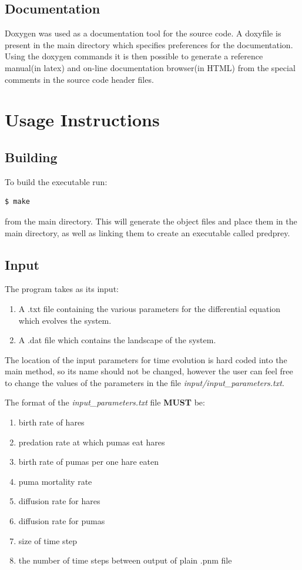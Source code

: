 \subsection{Documentation}
Doxygen was used as a documentation tool for the source code. A doxyfile is present in the main directory which specifies preferences for the documentation. Using the doxygen commands it is then possible to generate a reference manual(in latex) and on-line documentation browser(in HTML) from the special comments in the source code header files. 

\section{Usage Instructions}

\subsection{Building}
To build the executable run:
\begin{lstlisting}[language=bash]
$ make

\end{lstlisting}
from the main directory. This will generate the object files and place them in the main directory, as well as linking them to create an executable called predprey.

\subsection{Input}
The program takes as its input: 
\begin{enumerate}
\item A .txt file containing the various parameters for the differential equation which evolves the system. 
\item A .dat file which contains the landscape of the system. 
\end{enumerate}

The location of the input parameters for time evolution is hard coded into the main method, so its name should not be changed, however the user can feel free to change the values of the parameters in the file \textit{input/input\_parameters.txt}.

The format of the \textit{input\_parameters.txt} file \textbf{MUST} be:
\begin{enumerate}
\item birth rate of hares 
\item predation rate at which pumas eat hares
\item birth rate of pumas per one hare eaten
\item puma mortality rate
\item diffusion rate for hares
\item diffusion rate for pumas
\item size of time step
\item the number of time steps between output of plain .pnm file
\end{enumerate}

